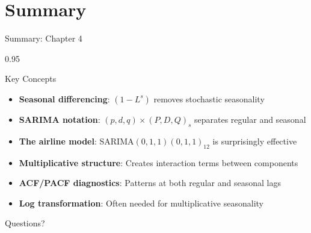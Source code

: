 \documentclass[9pt, aspectratio=169, t]{beamer}
\begin{document}
\section{Summary}

\begin{frame}{Summary: Chapter 4}
    \begin{cminipage}{0.95\textwidth}
    \begin{exampleblock}{Key Concepts}
        \begin{itemize}\setlength{\itemsep}{2pt}
            \item[\textcolor{MainBlue}{\textbf{1.}}] \textbf{Seasonal differencing}: $(1-L^s)$ removes stochastic seasonality
            \item[\textcolor{MainBlue}{\textbf{2.}}] \textbf{SARIMA notation}: $(p,d,q) \times (P,D,Q)_s$ separates regular and seasonal
            \item[\textcolor{MainBlue}{\textbf{3.}}] \textbf{The airline model}: SARIMA$(0,1,1)(0,1,1)_{12}$ is surprisingly effective
            \item[\textcolor{MainBlue}{\textbf{4.}}] \textbf{Multiplicative structure}: Creates interaction terms between components
            \item[\textcolor{MainBlue}{\textbf{5.}}] \textbf{ACF/PACF diagnostics}: Patterns at both regular and seasonal lags
            \item[\textcolor{MainBlue}{\textbf{6.}}] \textbf{Log transformation}: Often needed for multiplicative seasonality
        \end{itemize}
    \end{exampleblock}

    \vspace{0.5cm}
    \begin{center}
        \Large\textcolor{MainBlue}{Questions?}
    \end{center}
    \end{cminipage}
\end{frame}
\end{document}
